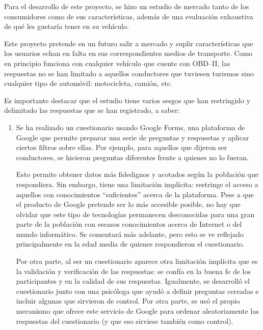 Para el desarrollo de este proyecto, se hizo un estudio de mercado tanto de los
consumidores como de sus características, además de una evaluación exhaustiva
de qué les gustaría tener en su vehículo.

Este proyecto pretende en un futuro salir a mercado y suplir características que los
usuarios echan en falta en sus correspondientes medios de transporte. Como en principio
funciona con cualquier vehículo que cuente con \ac{OBD}--II, las respuestas no se han
limitado a aquellos conductores que tuviesen turismos sino cualquier tipo de
automóvil: motocicleta, camión, etc.

Es importante destacar que el estudio tiene varios sesgos que han restringido
y delimitado las respuestas que se han registrado, a saber:

\begin{enumerate}
  \item Se ha realizado un cuestionario usando Google Forms, una plataforma de Google
        que permite preparar una serie de preguntas y respuestas y aplicar ciertos
        filtros sobre ellas. Por ejemplo, para aquellos que dijeron ser conductores,
        se hicieron preguntas diferentes frente a quienes no lo fueran.

        Esto permite obtener datos más fidedignos y acotados según la población que
        respondiera. Sin embargo, tiene una limitación implícita: restringe el acceso
        a aquellos con conocimientos ``suficientes'' acerca de la plataforma. Pese
        a que el producto de Google pretende ser lo más accesible posible, no hay
        que olvidar que este tipo de tecnologías permanecen desconocidas para una
        gran parte de la población con escasos conocimientos acerca de Internet o
        del mundo informático. Se comentará más adelante, pero esto se ve reflejado
        principalmente en la edad media de quienes respondieron el cuestionario.

        Por otra parte, al ser un cuestionario aparece otra limitación implícita
        que es la validación y verificación de las respuestas: se confía en la buena
        fe de los participantes y en la calidad de sus respuestas. Igualmente, se
        desarrolló el cuestionario junto con una psicóloga que ayudó a definir
        preguntas cerradas e incluir algunas que sirvieron de control. Por otra parte,
        se usó el propio mecanismo que ofrece este servicio de Google para ordenar
        aleatoriamente las respuestas del cuestionario (y que eso sirviese también
        como control).


\end{enumerate}
